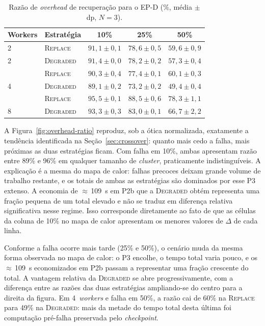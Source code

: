 \begin{table}[htb]
  \caption{Razão de \textit{overhead} de recuperação para o EP-D
           ($\%$, média $\pm$ dp, $N=3$).}
  \label{tab:overhead-ratio}
  \centering
  \begin{tabular}{l l c c c}
    \toprule
    Workers & Estratégia & 10\% & 25\% & 50\% \\
    \midrule
    2 & \textsc{Replace}  & $91{,}1 \pm 0{,}1$ & $78{,}6 \pm 0{,}5$ & $59{,}6 \pm 0{,}9$ \\
    2 & \textsc{Degraded} & $91{,}4 \pm 0{,}0$ & $78{,}2 \pm 0{,}2$ & $57{,}3 \pm 0{,}4$ \\
    \addlinespace
    4 & \textsc{Replace}  & $90{,}3 \pm 0{,}4$ & $77{,}4 \pm 0{,}1$ & $60{,}1 \pm 0{,}3$ \\
    4 & \textsc{Degraded} & $89{,}1 \pm 0{,}2$ & $73{,}2 \pm 0{,}2$ & $49{,}4 \pm 0{,}4$ \\
    \addlinespace
    8 & \textsc{Replace}  & $95{,}5 \pm 0{,}1$ & $88{,}5 \pm 0{,}6$ & $78{,}3 \pm 1{,}1$ \\
    8 & \textsc{Degraded} & $93{,}3 \pm 0{,}3$ & $83{,}0 \pm 0{,}1$ & $66{,}7 \pm 2{,}2$ \\
    \bottomrule
  \end{tabular}
\end{table}

A Figura~\ref{fig:overhead-ratio} reproduz, sob a ótica normalizada, exatamente a
tendência identificada na Seção~\ref{sec:crossover}: quanto mais cedo a falha, mais
próximas as duas estratégias ficam. Com falha em 10\%, ambas apresentam razão entre
89\% e 96\% em qualquer tamanho de \textit{cluster}, praticamente indistinguíveis. A
explicação é a mesma do mapa de calor: falhas precoces deixam grande volume de
trabalho restante, e os totais de ambas as estratégias são dominados por esse P3
extenso. A economia de $\approx$\,109~s em P2b que a \textsc{Degraded} obtém
representa uma fração pequena de um total elevado e não se traduz em diferença relativa
significativa nesse regime. Isso corresponde diretamente ao fato de que as células da
coluna de 10\% no mapa de calor apresentam os menores valores de $\Delta$ de cada
linha.

Conforme a falha ocorre mais tarde (25\% e 50\%), o cenário muda da mesma forma
observada no mapa de calor: o P3 encolhe, o tempo total varia pouco, e os
$\approx$\,109~s economizados em P2b passam a representar uma fração crescente do
total. A vantagem relativa da \textsc{Degraded} se abre progressivamente, com a
diferença entre as razões das duas estratégias ampliando-se do centro para a direita
da figura. Em 4~\textit{workers} e falha em 50\%, a razão cai de 60\% na
\textsc{Replace} para 49\% na \textsc{Degraded}: mais da metade do tempo total desta
última foi computação pré-falha preservada pelo \textit{checkpoint}.


